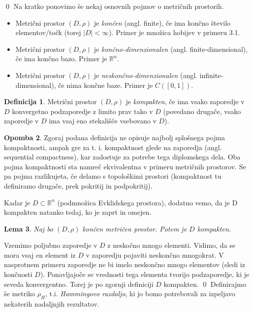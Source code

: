 \documentclass[12pt,a4paper]{amsart}
\theoremstyle{definition} %
\newtheorem{definicija}{Definicija}[section]
\newtheorem{opomba}[definicija]{Opomba}
\theoremstyle{plain} %
\newtheorem{lema}[definicija]{Lema}
\begin{document}
\qed
\newline
\newline
Na kratko ponovimo še nekaj osnovnih pojmov o metričnih prostorih.
\begin{itemize}
\item Metrični prostor $(D, \rho)$ je \textit{končen} (angl. finite), če ima končno število elementov/točk (torej $|D| < \infty$). Primer je množica hobijev v primeru 3.1.
\item Metrični prostor $(D, \rho)$ je \textit{končno-dimenzionalen} (angl. finite-dimensional), če ima končno bazo. Primer je $\mathbb{R}^n$.
\item Metrični prostor $(D, \rho)$ je \textit{neskončno-dimenzionalen} (angl. infinite-dimensional), če nima končne baze. Primer je $C([0,1])$.
\end{itemize}
\begin{definicija}
Metrični prostor $(D, \rho)$ je \textit{kompakten}, če ima vsako zaporedje v $D$ konvergetno podzaporedje z limito prav tako v $D$ (povedano drugače, vsako zaporedje v $D$ ima vsaj eno stekališče vsebovano v $D$).
\end{definicija}
\begin{opomba}
Zgoraj podana definicija ne opisuje najbolj splošnega pojma kompaktnosti, ampak gre za  t. i. kompaktnost glede na zaporedja (angl. sequential compactness), kar zadostuje za potrebe tega diplomskega dela. Oba pojma kompaktnosti sta namreč ekvivalentna v primeru metričnih prostorov. Se pa pojma razlikujeta, če delamo s topološkimi prostori (kompaktnost tu definiramo drugače, prek pokritij in podpokritij).
\end{opomba}
Kadar je $D \subset \mathbb{R}^n$ (podmnožica Evklidskega prostora), dodatno vemo, da je D kompakten natanko tedaj, ko je zaprt in omejen.
\begin{lema}
Naj bo $(D, \rho)$ končen metričen prostor. Potem je $D$ kompakten.
\end{lema}
\proof
Vzemimo poljubno zaporedje v $D$ z neskočno mnogo elementi. Vidimo, da se mora vsaj en element iz $D$ v zaporedju pojaviti neskončno mnogokrat. V nasprotnem primeru zaporedje ne bi imelo neskončno mnogo elementov (sledi iz končnosti $D$). Ponavljajoče se vrednosti tega elementa tvorijo podzaporedje, ki je seveda konvergentno. Torej je po zgornji definiciji $D$ kompakten.
\qed
\newline
\newline
Definirajmo še metriko $\rho_H$, t.i. \textit{Hammingovo razdaljo}, ki jo bomo potrebovali za izpeljavo nekaterih nadaljnjih rezultatov. 
\end{document}
